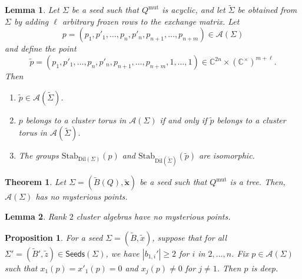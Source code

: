 \documentclass[10pt,a4paper]{amsart}
\newtheorem{theorem}{Theorem}
\newtheorem{lemma}{Lemma}
\newtheorem{proposition}{Proposition}
\newcommand{\C}{\mathbb{C}}
\newcommand{\Stab}{\mathrm{Stab}}
\newcommand{\dil}{\mathrm{Dil}}
\newcommand{\excluster}[1]{\widetilde{\mathbf{#1}}}
\newcommand{\exmatrix}[1]{\widetilde{#1}}
\newcommand{\mut}{\mathrm{mut}}
\newcommand{\seed}{\Sigma}
\newcommand{\seeds}{\mathsf{Seeds}}
\newcommand{\var}{\mathcal{A}}
\begin{document}
\begin{lemma}\label{lem:creating-deep-points-frozens}
    Let $\seed$ be a seed such that $Q^{\mut}$ is acyclic, and let $\widetilde{\seed}$ be obtained from $\seed$ by adding $\ell$ arbitrary frozen rows to the exchange matrix. Let 
    \[
    p = (p_1,p'_1,\dots, p_n, p'_n, p_{n+1}, \dots, p_{n+m}) \in \var(\seed)
    \]
    and define the point
    \[
    \widetilde{p} = (p_1, p'_1,\dots, p_n, p'_n, p_{n+1}, \dots, p_{n+m}, 1, \dots, 1) \in \C^{2n} \times (\C^{\times})^{m+\ell}.
    \]
    Then
    \begin{enumerate}
        \item $\widetilde{p} \in \var(\widetilde{\seed})$.
        \item $p$ belongs to a cluster torus in $\var(\seed)$ if and only if $\widetilde{p}$ belongs to a cluster torus in $\var(\widetilde{\seed})$.
        \item The groups $\Stab_{\dil(\seed)}(p)$ and $\Stab_{\dil(\widetilde{\seed})}(\widetilde{p})$ are isomorphic.
    \end{enumerate}
\end{lemma}

\begin{theorem}\label{thm:main-notintro}
Let $\seed = (\exmatrix{B}(Q), \excluster{x})$ be a seed such that $Q^{\mut}$ is a tree. Then, $\var(\seed)$ has no mysterious points. 
\end{theorem}

\begin{lemma}\label{lem:rank2}
Rank $2$ cluster algebras have no mysterious points.
\end{lemma}

\begin{proposition}\label{prop:so-may-deep}
For a seed $\seed  = (\exmatrix{B}, \exmatrix{x})$, suppose that for all $\seed' = (\exmatrix{B}', \exmatrix{z}) \in \seeds(\seed)$, we have $|b_{1,i}'| \geq 2$ for $i$ in $2, \dots, n$. 
Fix $p\in \var(\seed)$ such that $x_1(p) = x'_1(p)=0$ and $x_j(p) \neq 0$ for $j\neq1$. %
Then $p$ is deep. 
\end{proposition}
\end{document}

